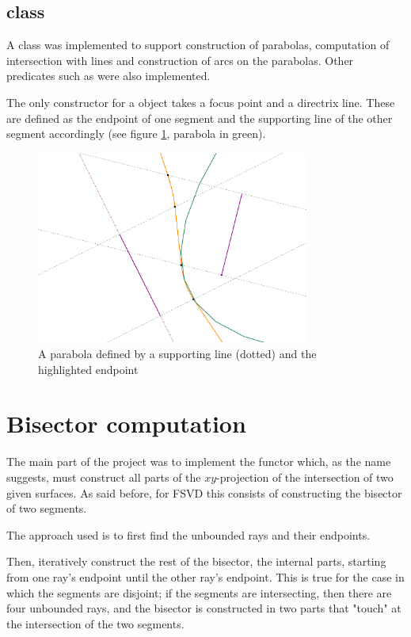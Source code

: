 \documentclass[11pt,a4paper,english]{article}
\begin{document}
	\subsection{ class}
	A  class was implemented to support construction of parabolas, computation of intersection with lines and construction of arcs on the parabolas. Other predicates such as  were also implemented.\par
	The only constructor for a  object takes a focus point and a directrix line. These are defined as the endpoint of one segment and the supporting line of the other segment accordingly (see figure \ref{fig:parabola}, parabola in green).
	\begin{figure}[h]
    \centering
    \includegraphics[width=0.8\textwidth]{parabola}
    \caption{A parabola defined by a supporting line (dotted) and the highlighted endpoint \label{fig:parabola}}
	\end{figure}
	
	

	\section{Bisector computation}
	The main part of the project was to implement the functor  which, as the name suggests, must construct all parts of the \(xy\)-projection of the intersection of two given surfaces. As said before, for FSVD this consists of constructing the bisector of two segments.\par
	The approach used is to first find the unbounded rays and their endpoints.\par
	Then, iteratively construct the rest of the bisector, the internal parts, starting from one ray's endpoint until the other ray's endpoint.
	This is true for the case in which the segments are disjoint; if the segments are intersecting, then there are four unbounded rays, and the bisector is constructed in two parts that "touch" at the intersection of the two segments.\ppar
	
\end{document}
